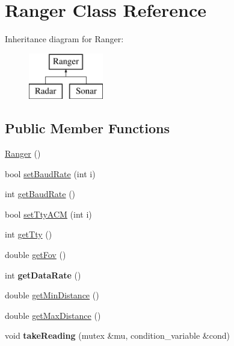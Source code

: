 \hypertarget{classRanger}{}\section{Ranger Class Reference}
\label{classRanger}
Inheritance diagram for Ranger\+:\begin{figure}[H]
\begin{center}
\leavevmode
\includegraphics[height=2.000000cm]{classRanger}
\end{center}
\end{figure}
\subsection*{Public Member Functions}
\begin{DoxyCompactItemize}
\item 
\hyperlink{classRanger_a65e1b9530f370b95cd673690c5bf02b5}{Ranger} ()
\item 
bool \hyperlink{classRanger_a5cb6fe854af1751438b1a836c6703f3f}{set\+Baud\+Rate} (int i)
\item 
int \hyperlink{classRanger_abd9461cf6b81f879986e6ef79a1a7269}{get\+Baud\+Rate} ()
\item 
bool \hyperlink{classRanger_af9e1edce24012a056905fe4e41eca784}{set\+Tty\+A\+CM} (int i)
\item 
int \hyperlink{classRanger_a10d0c5f291b2cd850e6d82717d1e179d}{get\+Tty} ()
\item 
double \hyperlink{classRanger_a92538e7e7c3b5346501ed4116b6a96bb}{get\+Fov} ()
\item 
int {\bfseries get\+Data\+Rate} ()\hypertarget{classRanger_a76768ed2f954887a5d4aa48271fdee3d}{}\label{classRanger_a76768ed2f954887a5d4aa48271fdee3d}

\item 
double \hyperlink{classRanger_ab08a6310dee156f89fdd28256b1055e5}{get\+Min\+Distance} ()
\item 
double \hyperlink{classRanger_a8e5aaf0373980c5196b171fe3371190c}{get\+Max\+Distance} ()
\item 
void {\bfseries take\+Reading} (mutex \&mu, condition\+\_\+variable \&cond)\hypertarget{classRanger_af3c38e14a1cec55729563b5feebf1e6f}{}\label{classRanger_af3c38e14a1cec55729563b5feebf1e6f}

\end{DoxyCompactItemize}
